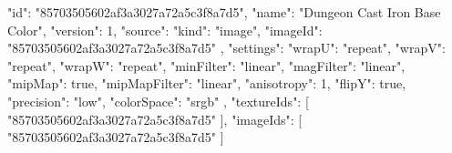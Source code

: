 {
  "id": "85703505602af3a3027a72a5c3f8a7d5",
  "name": "Dungeon Cast Iron Base Color",
  "version": 1,
  "source": {
    "kind": "image",
    "imageId": "85703505602af3a3027a72a5c3f8a7d5"
  },
  "settings": {
    "wrapU": "repeat",
    "wrapV": "repeat",
    "wrapW": "repeat",
    "minFilter": "linear",
    "magFilter": "linear",
    "mipMap": true,
    "mipMapFilter": "linear",
    "anisotropy": 1,
    "flipY": true,
    "precision": "low",
    "colorSpace": "srgb"
  },
  "textureIds": [
    "85703505602af3a3027a72a5c3f8a7d5"
  ],
  "imageIds": [
    "85703505602af3a3027a72a5c3f8a7d5"
  ]
}
